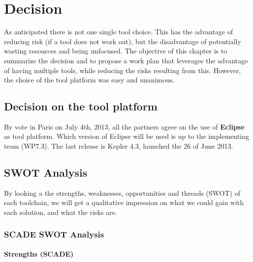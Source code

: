 
\newcommand{\decision}[1]{
\begin{center}
\begin{tabular}{ p{13cm} }
\stepcounter{decision}\textbf{Decision~\arabic{decision}}  \\
\hline
\multicolumn{1}{|p{13cm}|}{#1} \\
\hline
\end{tabular}
\end{center}
}


\chapter{Decision}
\label{sec:decision}

As anticipated there is not one single tool choice. This has the advantage of reducing risk (if a tool does not work out), but the disadvantage of potentially wasting resources and being unfocused.  The objective of this chapter is to summarize the decision and to propose a work plan that leverages the advantage of having multiple tools, while reducing the risks resulting from this.  However, the choice of the tool platform was easy and unanimous.

\section{Decision on the tool platform}

By vote in Paris on July 4th, 2013, all the partners agree on the use of \textbf{Eclipse} as tool platform.  Which version of Eclipse will be used is up to the implementing team (WP7.3).  The last release is Kepler 4.3, launched the 26 of June 2013.

\section{SWOT Analysis}

By looking a the strengths, weaknesses, opportunities and threads (SWOT) of each toolchain, we will get a qualitative impression on what we could gain with each solution, and what the risks are.

\subsection{SCADE SWOT Analysis}

\subsubsection{Strengths (SCADE)}

